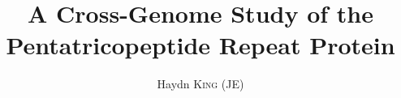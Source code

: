 \documentclass[11pt,a4paper, wide, twoside]{IIBproject}
\begin{document}



\author{Haydn \textsc{King} (JE)}
\title{A Cross-Genome Study of the Pentatricopeptide Repeat Protein}
\maketitle

\setcounter{page}{1}
\end{document}
